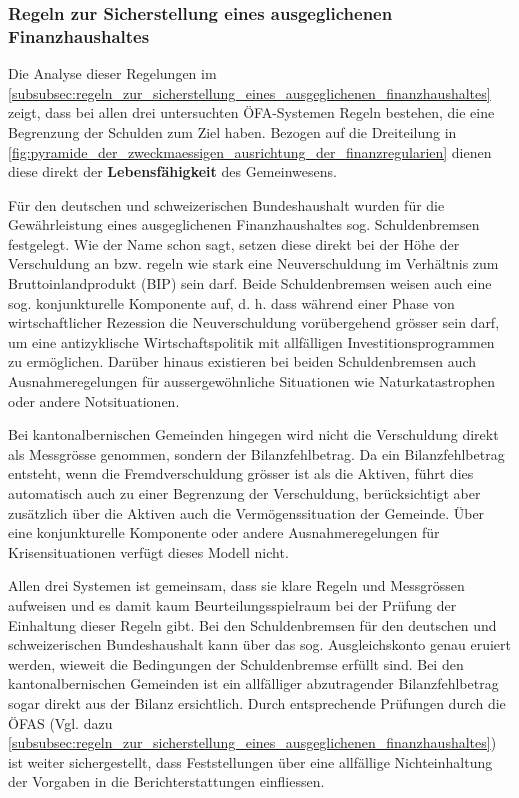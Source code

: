 \documentclass[10pt]{article}
\begin{document}
\subsubsection{Regeln zur Sicherstellung eines ausgeglichenen Finanzhaushaltes}\label{subsubsec:regeln_zur_sicherstellung_eines_ausgeglichenen_finanzhaushaltes}
Die Analyse dieser Regelungen im \vref{subsubsec:regeln_zur_sicherstellung_eines_ausgeglichenen_finanzhaushaltes} zeigt, dass bei allen drei untersuchten ÖFA-Systemen Regeln bestehen, die eine Begrenzung der Schulden zum Ziel haben. Bezogen auf die Dreiteilung in \vref{fig:pyramide_der_zweckmaessigen_ausrichtung_der_finanzregularien} dienen diese direkt der \textbf{Lebensfähigkeit} des Gemeinwesens.

Für den deutschen und schweizerischen Bundeshaushalt wurden für die Gewährleistung eines ausgeglichenen Finanzhaushaltes sog. Schuldenbremsen festgelegt. Wie der Name schon sagt, setzen diese direkt bei der Höhe der Verschuldung an bzw. regeln wie stark eine Neuverschuldung im Verhältnis zum Bruttoinlandprodukt (BIP) sein darf. Beide Schuldenbremsen weisen auch eine sog. konjunkturelle Komponente auf, d. h. dass während einer Phase von wirtschaftlicher Rezession die Neuverschuldung vorübergehend grösser sein darf, um eine antizyklische Wirtschaftspolitik mit allfälligen Investitions­programmen zu ermöglichen. Darüber hinaus existieren bei beiden Schuldenbremsen auch Ausnahmeregelungen für ausser­ge­wöhnliche Situationen wie Naturkatastrophen oder andere Notsituationen.

Bei kantonalbernischen Gemeinden hingegen wird nicht die Verschuldung direkt als Messgrösse genommen, sondern der Bilanzfehlbetrag. Da ein Bilanzfehlbetrag entsteht, wenn die Fremdverschuldung grösser ist als die Aktiven, führt dies automatisch auch zu einer Begrenzung der Verschuldung, berücksichtigt aber zusätzlich über die Aktiven auch die Vermögenssituation der Gemeinde. Über eine konjunkturelle Komponente oder andere Ausnahmeregelungen für Krisensituationen verfügt dieses Modell nicht.

Allen drei Systemen ist gemeinsam, dass sie klare Regeln und Messgrössen aufweisen und es damit kaum Beurteilungsspielraum bei der Prüfung der Einhaltung dieser Regeln gibt. Bei den Schuldenbremsen für den deutschen und schweizerischen Bundeshaushalt kann über das sog. Ausgleichskonto genau eruiert werden, wieweit die Bedingungen der Schuldenbremse erfüllt sind. Bei den kantonalbernischen Gemeinden ist ein allfälliger abzutragender Bilanzfehlbetrag sogar direkt aus der Bilanz ersichtlich. Durch entsprechende Prüfungen durch die ÖFAS (Vgl. dazu \vref{subsubsec:regeln_zur_sicherstellung_eines_ausgeglichenen_finanzhaushaltes}) ist weiter sichergestellt, dass Feststellungen über eine allfällige Nichteinhaltung der Vorgaben in die Berichterstattungen einfliessen.
\end{document}
